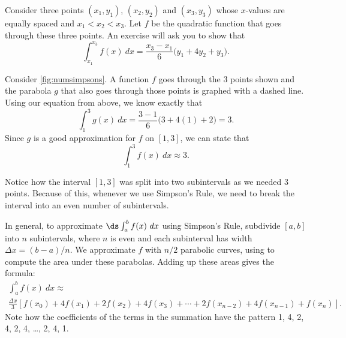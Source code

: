 Consider three points $(x_1,y_1)$, $(x_2,y_2)$ and $(x_3,y_3)$ whose $x$-values are equ\-ally spaced and $x_1<x_2<x_3$. Let $f$ be the quadratic function that goes through these three points. An exercise will ask you to show that 
\begin{equation}
\int_{x_1}^{x_3} f(x)\ dx = \frac{x_3-x_1}{6}\big(y_1+4y_2+y_3\big).\label{eq:simpsons}
\end{equation}


Consider \autoref{fig:numsimpsons}. A function $f$ goes through the 3 points shown and the parabola $g$ that also goes through those points is graphed with a dashed line. Using our equation from above, we know exactly that
\[\int_1^3 g(x) \ dx = \frac{3-1}{6}\big(3+4(1)+2\big)= 3.\]
Since $g$ is a good approximation for $f$ on $[1,3]$, we can state that
\[\int_1^3 f(x)\ dx \approx 3.\]

Notice how the interval $[1,3]$ was split into two subintervals as we needed 3 points. Because of this, whenever we use Simpson's Rule, we need to break the interval into an even number of subintervals. 

In general, to approximate $\ds \int_a^b f(x)\ dx$ using Simpson's Rule, subdivide $[a,b]$ into $n$ subintervals, where $n$ is even and each subinterval has width $\Delta x = (b-a)/n$. We approximate $f$ with $n/2$ parabolic curves, using  to compute the area under these parabolas. Adding up these areas gives the formula:
\begin{multline*}
\int_a^b f(x) \ dx\approx\\
\frac{\Delta x}3
\left[f(x_0)+4f(x_1)+2f(x_2)+4f(x_3)+\dotsb+2f(x_{n-2})+4f(x_{n-1})+f(x_n)\right].
\end{multline*}
Note how the coefficients of the terms in the summation have the pattern 1, 4, 2, 4, 2, 4, \dots, 2, 4, 1.

